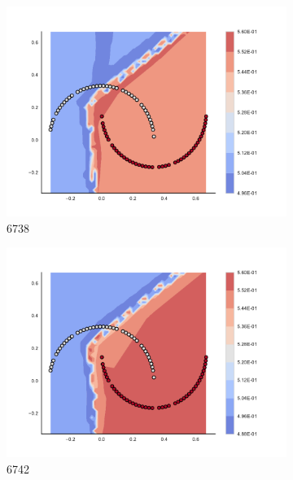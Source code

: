 \begin{figure}[h]
\begin{subfigure}[b]{0.09\textwidth}
    \includegraphics[clip, trim=2.35cm 1.75cm 4.5cm 0cm,width=\textwidth]{img/convergence/6738.pdf}
    \caption{6738}
    \label{fig:convergence_6738}
\end{subfigure}
%
\begin{subfigure}[b]{0.09\textwidth}
    \includegraphics[clip, trim=2.35cm 1.75cm 4.5cm 0cm,width=\textwidth]{img/convergence/6742.pdf}
    \caption{6742}
    \label{fig:convergence_6742}
\end{subfigure}
%
\begin{subfigure}[b]{0.09\textwidth}

\end{subfigure}
\end{figure}
